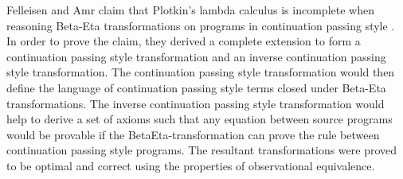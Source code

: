 
\usepackage{algorithm}
\usepackage{listings}
\usepackage{graphicx,amssymb,amsmath}
\usepackage{epstopdf}
\usepackage{setspace}
\sloppy

\oddsidemargin 0in
\evensidemargin 0in
\textwidth 6.5in
\topmargin -0.5in
\textheight 9.0in



\def \cps {continuation passing style }


\pagestyle{myheadings}  %
	 	
\doublespacing
Felleisen and Amr claim that Plotkin's lambda calculus is incomplete when reasoning Beta-Eta transformations on programs in \cps.  In order to prove the claim, they derived a complete extension to form a \cps transformation and an inverse \cps transformation.  The \cps transformation would then define the language of \cps terms closed under Beta-Eta transformations.  The inverse \cps transformation would help to derive a set of axioms such that any equation between source programs would be provable if the BetaEta-transformation can prove the rule between \cps programs.  The resultant transformations were proved to be optimal and correct using the properties of observational equivalence.


